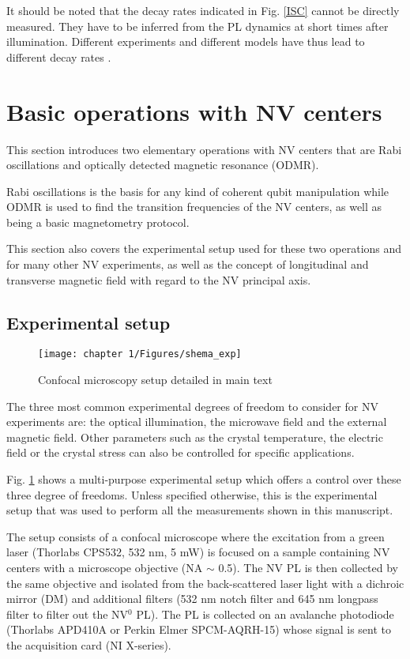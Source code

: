 \documentclass[a4paper,11pt]{report}
\begin{document}
\begin{refsection}
It should be noted that the decay rates indicated in Fig. \ref{ISC} cannot be directly measured. They have to be inferred from the PL dynamics at short times after illumination. Different experiments and different models have thus lead to different decay rates \citep{duarte2021effect}. 


\section{Basic operations with NV centers}

This section introduces two elementary operations with NV centers that are Rabi oscillations and optically detected magnetic resonance (ODMR).

Rabi oscillations is the basis for any kind of coherent qubit manipulation while ODMR is used to find the transition frequencies of the NV centers, as well as being a basic magnetometry protocol.

This section also covers the experimental setup used for these two operations and for many other NV experiments, as well as the concept of longitudinal and transverse magnetic field with regard to the NV principal axis.

\subsection{Experimental setup}
\begin{figure}[h!]
\centering
\texttt{[image: chapter 1/Figures/shema\_exp]}
\caption{Confocal microscopy setup detailed in main text}
\label{setup}
\end{figure}
The three most common experimental degrees of freedom to consider for NV experiments are: the optical illumination, the microwave field and the external magnetic field. Other parameters such as the crystal temperature, the electric field or the crystal stress can also be controlled for specific applications.

Fig. \ref{setup} shows a multi-purpose experimental setup which offers a control over these three degree of freedoms. Unless specified otherwise, this is the experimental setup that was used to perform all the measurements shown in this manuscript. 

The setup consists of a confocal microscope where the excitation from a green laser (Thorlabs CPS532, 532 nm, 5 mW) is focused on a sample containing NV centers with a microscope objective (NA $\sim$ 0.5). The NV PL is then collected by the same objective and isolated from the back-scattered laser light with a dichroic mirror (DM) and additional filters (532 nm notch filter and 645 nm longpass filter to filter out the NV$^0$ PL). The PL is collected on an avalanche photodiode (Thorlabs APD410A or Perkin Elmer SPCM-AQRH-15) whose signal is sent to the acquisition card (NI X-series).


\end{refsection}
\end{document}
